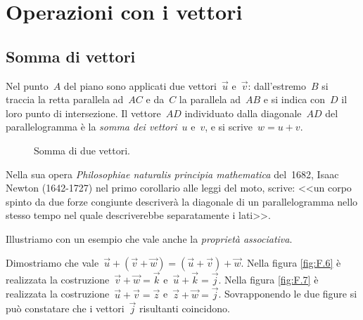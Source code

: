 
\section{Operazioni con i vettori}
\label{sec:vett_operazioni}

\subsection{Somma di vettori}
\begin{definizione}
Nel punto~$A$ del piano sono applicati due vettori~$\vec{u}$ e~$\vec{v}$: 
dall'estremo~$B$ si
traccia la retta parallela ad~$AC$ e da~$C$ la parallela ad~$AB$ e si indica 
con~$D$ il loro punto di intersezione.
Il vettore~$AD$ individuato dalla diagonale~$AD$ del parallelogramma è la 
\emph{somma dei vettori}~$u$ e~$v$, e si scrive~$w=u+v$.
\end{definizione}


\begin{inaccessibleblock}
 \begin{figure}[h]
\centering

 \caption{Somma di due vettori.}
 \label{fig:vett_somma_parallelogramma}
\end{figure}
\end{inaccessibleblock}

Nella sua opera \emph{Philosophiae naturalis principia mathematica} del~1682, 
Isaac Newton (1642-1727) nel primo corollario alle leggi del moto,
scrive: 
<<un corpo spinto da due forze congiunte descriverà la diagonale di un 
parallelogramma nello stesso tempo nel quale descriverebbe separatamente i 
lati>>.


Illustriamo con un esempio che vale anche la \emph{proprietà associativa}.

\begin{esempio}
Dimostriamo che vale~$\vec{u}+(\vec{v}+\vec{w})=(\vec{u}+\vec{v})+\vec{w}$.
Nella figura \ref{fig:F.6} è realizzata la 
costruzione~$\vec{v}+\vec{w}=\vec{k}$ e~$\vec{u}+\vec{k}=\vec{j}$.
Nella figura \ref{fig:F.7} è realizzata la 
costruzione~$\vec{u}+\vec{v}=\vec{z}$ e~$\vec{z}+\vec{w}=\vec{j}$.
Sovrapponendo le due figure si può constatare che i vettori~$\vec{j}$ 
risultanti coincidono.
\end{esempio}


